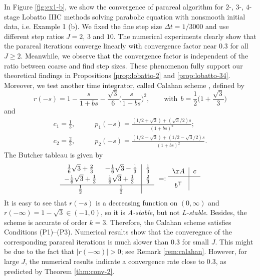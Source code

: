 In Figure \ref{fig:ex1-b}, we show the convergence of parareal algorithm for $2$-, $3$-, $4$-stage Lobatto IIIC methods solving
parabolic equation with nonsmooth initial data, i.e. Example 1 (b).
We fixed the fine step size $\Delta t = 1/3000$ and use different step ratios $J=2$, $3$ and $10$.
The numerical experiments clearly show that the parareal iterations converge linearly with convergence factor near $0.3$
for all $J\ge 2$. Meanwhile,
we observe that the convergence factor is independent of the ratio between coarse and find step sizes.
These phenomenon fully support our theoretical findings in  Propositions \ref{prop:lobatto-2} and \ref{prop:lobatto-34}.
Moreover, we test another time integrator,
called Calahan scheme \cite[eq. (1.9)]{Zlama:1974}, defined by
\begin{equation}\label{eqn:Calahan}
    r(-s) = 1-\frac{s}{1+bs} - \frac{\sqrt{3}}{6} \Big(\frac{s}{1+bs}  \Big)^2,\qquad \text{with}~~ b = \frac12\Big( 1 + \frac{\sqrt{3}}{3} \Big)
\end{equation}
and
\begin{equation}\label{eqn:Calahan-p}
\begin{aligned}
c_1 = \frac13,\qquad & p_1(-s) = \frac{(1/2 + \sqrt3) + (\sqrt3/2)s}{(1+bs)^2};\\
c_2 = \frac23,\qquad & p_2(-s) = \frac{(1/2 - \sqrt3) + (1/2 - \sqrt3/2)s}{(1+bs)^2}.
\end{aligned}
\end{equation}
The Butcher tableau is given by
\begin{equation}
\label{calahan}
\begin{tabular}{cc|c}
 $\frac16\sqrt{3}+\frac23$ &  $-\frac16\sqrt{3}-\frac13$  & $\frac13$\\[2pt]
 $-\frac16\sqrt{3}+\frac13$  & $\frac16\sqrt{3}+\frac13 $& $\frac23$ \\[2pt]
\hline
 $\frac12 $  & $\frac12$  & $\; $ \\
\end{tabular}
\ =:
\begin{tabular}{c|c}
 $\AA$ & $c$ \\[1pt]
\hline
 $b^\top$  & $\vphantom{\sum^{\sum^\sum}} $ \\
\end{tabular}
\end{equation}
It is easy to see that  $r(-s)$ is a decreasing function on $(0, \infty)$ and $r(-\infty)=1-\sqrt{3} \in (-1,0)$, so it is \textsl{A-stable}, but not \textsl{L-stable}.
Besides, the scheme is accurate of order $k=3$.
Therefore, the Calahan scheme satisfies Conditions (P1)--(P3).
Numerical results show that the converegnce of the corresponding parareal iterations is much slower than $0.3$ for small $J$.
This might be due to the fact that $|r(-\infty)| > 0$; see Remark \ref{rem:calahan}. However, for large $J$, the numerical results indicate a convergence rate close to $0.3$,
as predicted by Theorem \ref{thm:conv-2}.\vskip10pt



